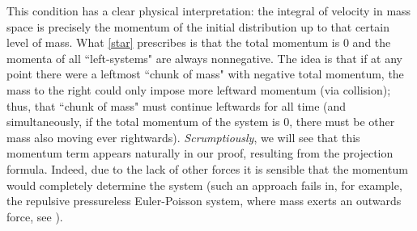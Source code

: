 \documentclass[11pt]{article}
\newcommand{\comm}[1]{}
\newtheorem{cor}[thm]{Corollary}
\numberwithin{equation}{section}
\begin{document}
    This condition has a clear physical interpretation: the integral of velocity in mass space is precisely the momentum of the initial distribution up to that certain level of mass. What \eqref{star} prescribes is that the total momentum is $0$ and the momenta of all ``left-systems" are always nonnegative. The idea is that if at any point there were a leftmost ``chunk of mass" with negative total momentum, %
    the mass to the right could only impose more leftward momentum (via collision); thus, that ``chunk of mass" must continue leftwards for all time (and simultaneously, if the total momentum of the system is 0, there must be other mass also moving ever rightwards). \textit{Scrumptiously}\comm{{\color{red} you guys are gonna make me remove this but I think it's a good word in this context} No, it is appropriate here. - Joseph}, we will see that this momentum term appears naturally in our proof, resulting from the projection formula. Indeed, due to the lack of other forces it is sensible that the momentum would completely determine the system (such an approach fails in, for example, the repulsive pressureless Euler-Poisson system, where mass exerts an outwards force, see \cite{Repulsive-Paper}). 
\end{document}
